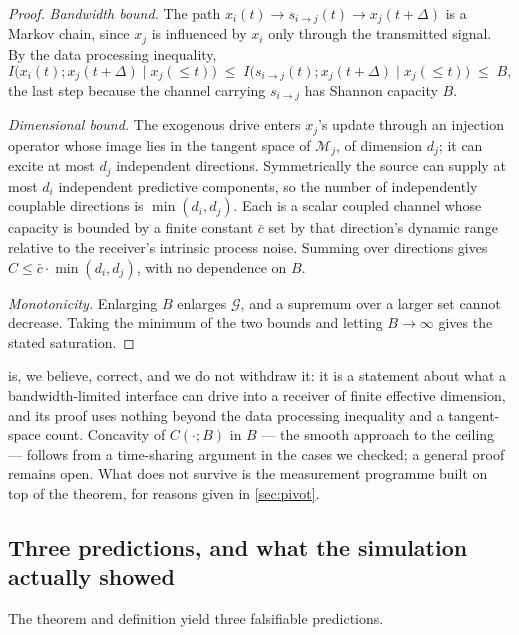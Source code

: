 \documentclass[11pt,a4paper]{article}
\theoremstyle{plain}
\theoremstyle{definition}
\theoremstyle{remark}
\begin{document}
\begin{proof}
\emph{Bandwidth bound.} The path $x_i(t) \to s_{i\to j}(t) \to x_j(t+\Delta)$ is a Markov
chain, since $x_j$ is influenced by $x_i$ only through the transmitted signal. By the data
processing inequality,
\[
I\big(x_i(t); x_j(t{+}\Delta)\mid x_j(\le t)\big)
\;\le\; I\big(s_{i\to j}(t); x_j(t{+}\Delta)\mid x_j(\le t)\big) \;\le\; B,
\]
the last step because the channel carrying $s_{i\to j}$ has Shannon capacity $B$.

\emph{Dimensional bound.} The exogenous drive enters $x_j$'s update through an injection
operator whose image lies in the tangent space of $\mathcal{M}_j$, of dimension $d_j$; it can
excite at most $d_j$ independent directions. Symmetrically the source can supply at most $d_i$
independent predictive components, so the number of independently couplable directions is
$\min(d_i,d_j)$. Each is a scalar coupled channel whose capacity is bounded by a finite
constant $\bar{c}$ set by that direction's dynamic range relative to the receiver's intrinsic
process noise. Summing over directions gives $C \le \bar{c}\cdot\min(d_i,d_j)$, with no
dependence on $B$.

\emph{Monotonicity.} Enlarging $B$ enlarges $\mathcal{G}$, and a supremum over a larger set
cannot decrease. Taking the minimum of the two bounds and letting $B\to\infty$ gives the
stated saturation.
\end{proof}

 is, we believe, correct, and we do not withdraw it: it is a statement
about what a bandwidth-limited interface can drive into a receiver of finite effective
dimension, and its proof uses nothing beyond the data processing inequality and a tangent-space
count. Concavity of $C(\cdot;B)$ in $B$ --- the smooth approach to the ceiling --- follows from
a time-sharing argument in the cases we checked; a general proof remains open. What does not
survive is the measurement programme built on top of the theorem, for reasons given in
\cref{sec:pivot}.

\subsection{Three predictions, and what the simulation actually showed}\label{sec:sim}

The theorem and definition yield three falsifiable predictions.
\end{document}
